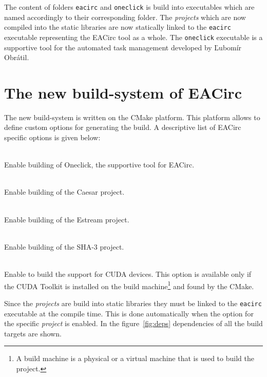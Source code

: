 \documentclass[12pt,twoside]{fithesis2}
\begin{document}
The content of folders \texttt{eacirc} and \texttt{oneclick} is build into executables which are named accordingly to their corresponding folder. The \emph{projects} which are now compiled into the static libraries are now statically linked to the \texttt{eacirc} executable representing the EACirc tool as a whole. The \texttt{oneclick} executable is a supportive tool for the automated task management developed by Ľubomír Obrátil.~\cite{oneclick}

\section{The new build-system of EACirc}

The new build-system is written on the CMake platform. This platform allows to define custom options for generating the build. A descriptive list of EACirc specific options is given below:

\begin{description}[noitemsep]
	\item[\texttt{BUILD\_ONECLICK}] \hfill \\
	Enable building of Oneclick, the supportive tool for EACirc.
	\item[\texttt{BUILD\_CAESAR}] \hfill \\
	Enable building of the Caesar project.
	\item[\texttt{BUILD\_ESTREAM}] \hfill \\
	Enable building of the Estream project.
	\item[\texttt{BUILD\_SHA3}] \hfill \\
	Enable building of the SHA-3 project.
	\item[\texttt{BUILD\_CUDA}] \hfill \\
	Enable to build the support for CUDA devices. This option is available only if the CUDA Toolkit \cite{cuda_toolkit} is installed on the build machine\footnote{A build machine is a physical or a virtual machine that is used to build the project.} and found by the CMake.
\end{description}

\noindent
Since the \emph{projects} are build into static libraries they must be linked to the \texttt{eacirc} executable at the compile time. This is done automatically when the option for the specific \emph{project} is enabled. In the figure~\ref{fig:deps} dependencies of all the build targets are shown.
\end{document}
